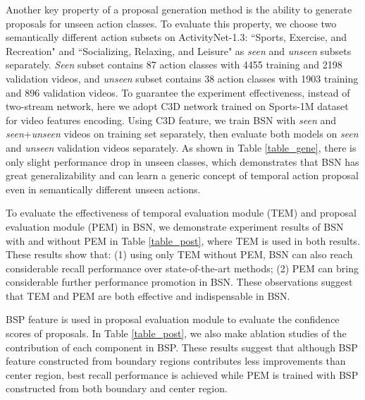 \documentclass[runningheads]{llncs}
\begin{document}
 Another key property of a proposal generation method  is the ability to generate proposals for unseen action classes. 
%
To evaluate this property, we choose two  semantically different action subsets on ActivityNet-1.3: ``Sports, Exercise, and Recreation" and ``Socializing, Relaxing, and Leisure" as \emph{seen} and \emph{unseen} subsets separately. \emph{Seen} subset contains 87 action classes with 4455  training and 2198 validation videos, and \emph{unseen} subset contains 38 action classes with 1903  training and 896 validation videos. 
%
To guarantee the experiment effectiveness, instead of two-stream network, here we adopt C3D network \cite{tran2017convnet} trained on Sports-1M dataset \cite{sports1m} for video features encoding. Using C3D feature, we train BSN with \emph{seen} and \emph{seen}+\emph{unseen} videos on training set separately, then evaluate both models on \emph{seen} and \emph{unseen} validation videos separately.
%
As shown in Table \ref{table_gene},  there is only slight performance drop in unseen classes, which demonstrates that BSN  has great generalizability and can learn a generic concept of temporal action proposal even in semantically different unseen actions.

To evaluate the effectiveness of  temporal evaluation module (TEM) and proposal evaluation module (PEM) in BSN, we demonstrate experiment results of BSN with and without PEM in Table \ref{table_post}, where TEM is used in both results. These results show that: (1) using only TEM without PEM, BSN can also reach considerable recall performance over  state-of-the-art methods; (2) PEM can bring considerable further  performance promotion in BSN. These observations suggest that TEM and PEM are both effective and indispensable in BSN.

BSP feature is used in proposal evaluation module to evaluate the confidence scores of proposals. In Table \ref{table_post}, we also make ablation studies of the contribution of each component in BSP.  These results suggest that although BSP feature constructed from   boundary regions contributes less improvements than  center region, best recall performance is achieved while PEM is trained with BSP constructed from both boundary and center region.





\vspace{-0.25cm}
\end{document}
